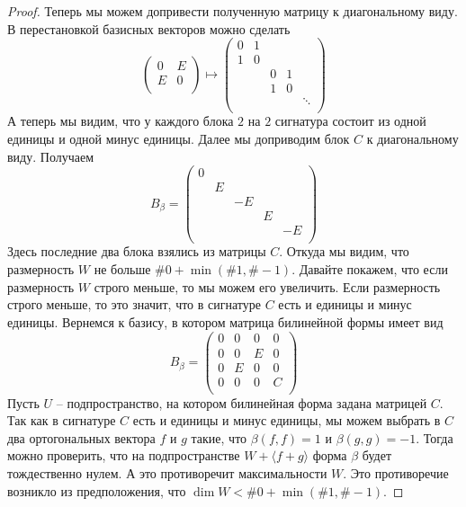 \begin{proof}
Теперь мы можем допривести полученную матрицу к диагональному виду.
В перестановкой базисных векторов можно сделать
\[
\begin{pmatrix}
{0}&{E}\\
{E}&{0}\\
\end{pmatrix}
\mapsto
\begin{pmatrix}
{0}&{1}&{}&{}&{}\\
{1}&{0}&{}&{}&{}\\
{}&{}&{0}&{1}&{}\\
{}&{}&{1}&{0}&{}\\
{}&{}&{}&{}&{\ddots}\\
\end{pmatrix}
\]
А теперь мы видим, что у каждого блока $2$ на $2$ сигнатура состоит из одной единицы и одной минус единицы.
Далее мы доприводим блок $C$ к диагональному виду.
Получаем
\[
B_\beta =
\begin{pmatrix}
{0}&{}&{}&{}&{}\\
{}&{E}&{}&{}&{}\\
{}&{}&{-E}&{}&{}\\
{}&{}&{}&{E}&{}\\
{}&{}&{}&{}&{-E}\\
\end{pmatrix}
\]
Здесь последние два блока взялись из матрицы $C$.
Откуда мы видим, что размерность $W$ не больше $\#0 + \min(\#1, \#-1)$.
Давайте покажем, что если размерность $W$ строго меньше, то мы можем его увеличить.
Если размерность строго меньше, то это значит, что в сигнатуре $C$ есть и единицы и минус единицы.
Вернемся к базису, в котором матрица билинейной формы имеет вид
\[
B_\beta = 
\begin{pmatrix}
{0}&{0}&{0}&{0}\\
{0}&{0}&{E}&{0}\\
{0}&{E}&{0}&{0}\\
{0}&{0}&{0}&{C}\\
\end{pmatrix}
\]
Пусть $U$ -- подпространство, на котором билинейная форма задана матрицей $C$.
Так как в сигнатуре $C$ есть и единицы и минус единицы, мы можем выбрать в $C$ два ортогональных вектора $f$ и $g$ такие, что $\beta(f,f) = 1$ и $\beta(g,g) = -1$.
Тогда можно проверить, что на подпространстве $W + \langle f + g\rangle$ форма $\beta$ будет тождественно нулем.
А это противоречит максимальности $W$.
Это противоречие возникло из предположения, что $\dim W < \#0 + \min(\#1, \#-1)$.
\end{proof}

